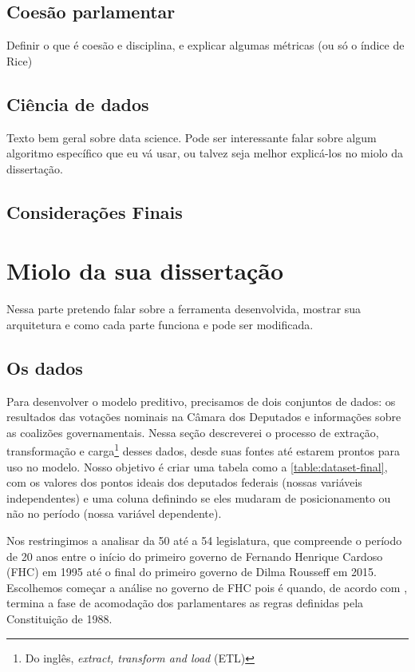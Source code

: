 \documentclass[a4paper,titlepage]{ppgi}\usepackage[]{graphicx}\usepackage[]{color}
\begin{document}
\section{Coesão parlamentar}

Definir o que é coesão e disciplina, e explicar algumas métricas (ou só o índice de Rice)


\section{Ciência de dados}

Texto bem geral sobre data science. Pode ser interessante falar sobre algum algoritmo específico que eu vá usar, ou talvez seja melhor explicá-los no miolo da dissertação.

\section{Considerações Finais}









\chapter{Miolo da sua dissertação}\label{cap:miolo}

Nessa parte pretendo falar sobre a ferramenta desenvolvida, mostrar sua arquitetura e como cada parte funciona e pode ser modificada.

\section{Os dados}

Para desenvolver o modelo preditivo, precisamos de dois conjuntos de dados: os
resultados das votações nominais na Câmara dos Deputados e informações sobre as
coalizões governamentais. Nessa seção descreverei o processo de extração,
transformação e carga\footnote{Do inglês, \emph{extract, transform and load}
(ETL)} desses dados, desde suas fontes até estarem prontos para uso no modelo.
Nosso objetivo é criar uma tabela como a \ref{table:dataset-final}, com os
valores dos pontos ideais dos deputados federais (nossas variáveis
independentes) e uma coluna definindo se eles mudaram de posicionamento ou não
no período (nossa variável dependente).

Nos restringimos a analisar da 50\textordfeminine{} até a 54\textordfeminine{}
legislatura, que compreende o período de 20 anos entre o início do primeiro
governo de Fernando Henrique Cardoso (FHC) em 1995 até o final do primeiro
governo de Dilma Rousseff em 2015. Escolhemos começar a análise no governo de
FHC pois é quando, de acordo com , termina a fase de
acomodação dos parlamentares as regras definidas pela Constituição de 1988.
\end{document}
